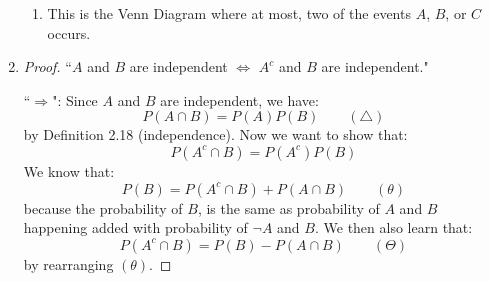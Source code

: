 \documentclass[12pt]{article}
\begin{document}
\begin{enumerate}
\begin{enumerate}
		\item This is the Venn Diagram where at most, two of the events $A$, $B$, or $C$ occurs.
		
	\end{enumerate}
	
	\item 
	\begin{proof}
	``$A$ and $B$ are independent $\Leftrightarrow$ $A^{c}$ and $B$ are independent."
	
	``$\Rightarrow$": Since $A$ and $B$ are independent, we have:
	$$P(A \cap B) = P(A)P(B) \qquad (\triangle)$$ 
	by Definition 2.18 (independence).
	Now we want to show that:
	$$P(A^{c} \cap B) = P(A^{c})P(B)$$
	We know that:
	$$P(B) = P(A^{c} \cap B) + P(A \cap B) \qquad (\theta)$$ 
	because the probability of $B$, is the same as probability of $A$ and $B$ happening added with probability of $\neg A$ and $B$. We then also learn that:
	$$P(A^{c} \cap B) = P(B) - P(A \cap B) \qquad (\Theta)$$
	by rearranging $(\theta)$. 
	

\end{proof}
\end{enumerate}
\end{document}

